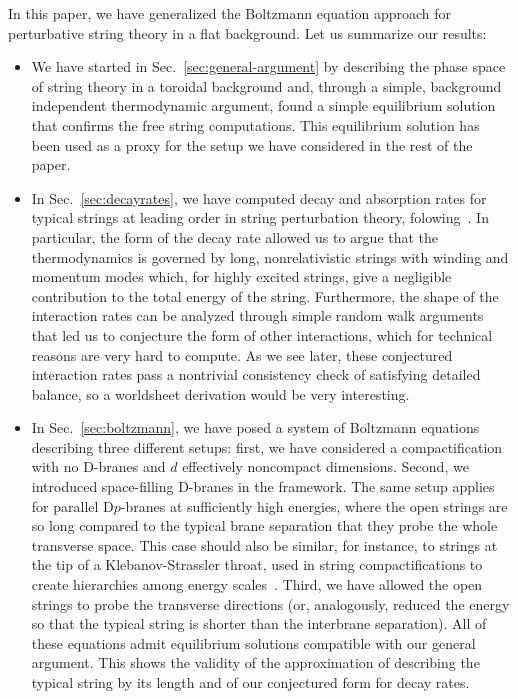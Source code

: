 \documentclass[a4paper,11pt]{article}
\begin{document}
In this paper, we have generalized the Boltzmann equation approach for perturbative string theory in a flat background.
Let us summarize our results:
\begin{itemize}
    \item We have started in Sec.~\ref{sec:general-argument} by describing the phase space of string theory in a toroidal background and, through a simple, background independent thermodynamic argument, found a simple equilibrium solution that confirms the free string computations.
    This equilibrium solution has been used as a proxy for the setup we have considered in the rest of the paper.
    \item In Sec.~\ref{sec:decayrates}, we have computed decay and absorption rates for typical strings at leading order in string perturbation theory, folowing~\cite{Manes:2001cs}.
    In particular, the form of the decay rate allowed us to argue that the thermodynamics is governed by long, nonrelativistic strings with winding and momentum modes which, for highly excited strings, give a negligible contribution to the total energy of the string.
    Furthermore, the shape of the interaction rates can be analyzed through simple random walk arguments that led us to conjecture the form of other interactions, which for technical reasons are very hard to compute. As we see later, these conjectured interaction rates pass a nontrivial consistency check of satisfying detailed balance, so a worldsheet derivation would be very interesting.
\item  In Sec.~\ref{sec:boltzmann}, we have posed a system of        Boltzmann equations describing three different setups: first, we have considered a compactification with no D-branes and $d$ effectively noncompact dimensions.
    Second, we introduced space-filling D-branes in the framework. The same setup applies for parallel D$p$-branes at sufficiently high energies, where the open strings are so long compared to the typical brane separation that they probe the whole transverse space. This case should also be similar, for instance, to strings at the tip of a Klebanov-Strassler throat, used in string compactifications to create hierarchies among energy scales~\cite{Klebanov:2000hb,Giddings:2001yu}.
    Third, we have allowed the open strings to probe the transverse directions (or, analogously, reduced the energy so that the typical string is shorter than the interbrane separation).
    All of these equations admit equilibrium solutions compatible with our general argument. 
    This shows the validity of the approximation of describing the typical string by its length and of our conjectured form for decay rates.

\end{itemize}
\end{document}
